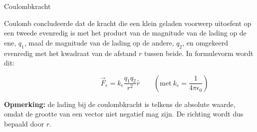 \begin{theo}[Coulombkracht]{Coulombkracht}

    Coulomb concludeerde dat de kracht die een klein geladen voorwerp uitoefent op een tweede evenredig is met het product van de magnitude van de lading op de ene, $ q_1 $, maal de magnitude van de lading op de andere, $ q_2 $, en omgekeerd evenredig met het kwadraat van de afstand $ r $ tussen beide. In formulevorm wordt dit:
    
    \begin{equation*}
        \hspace{3cm} \Vec{F}_{e} = k_e\dfrac{q_1q_2}{r^2}\hat{r} \quad \quad \left(\text{met} \ k_e = \dfrac{1} {4\pi\epsilon_0}\right)
    \end{equation*}
    
    

    \noindent \textbf{Opmerking:} de lading bij de coulombkracht is telkens de absolute waarde, omdat de grootte van een vector niet negatief mag zijn. De richting wordt dus bepaald door $\hat{r}$.
\end{theo}

